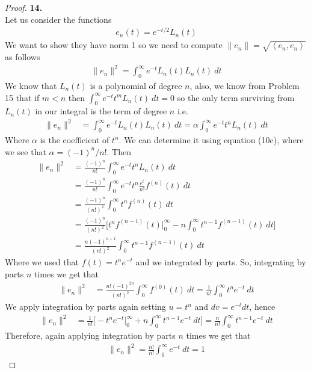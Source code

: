 \documentclass[11pt]{article}
\newcommand{\inprd}[1]{\left\langle{#1}\right\rangle}
\theoremstyle{definition}
\begin{document}
\cleardoublepage
\begin{proof}{\textbf{14.}}\\
Let us consider the functions 
\begin{align*}
    e_n(t) = e^{-t/2}L_n(t)
\end{align*}
We want to show they have norm 1 so we need to compute
$\|e_n\| = \sqrt{\inprd{e_n, e_n}}$ as follows
\begin{align*}
    \|e_n\|^2 = \int_0^\infty e^{-t}L_n(t) L_n(t)~dt
\end{align*}
We know that $L_n(t)$ is a polynomial of degree $n$, also, we know from
Problem 15 that if $m < n$ then $\int_0^\infty e^{-t}t^m L_n(t)~dt = 0$
so the only term surviving from $L_n(t)$ in our integral is the term of degree
$n$ i.e.
\begin{align*}
    \|e_n\|^2 &= \int_0^\infty e^{-t}L_n(t) L_n(t)~dt
    = \alpha\int_0^\infty e^{-t}t^n L_n(t)~dt
\end{align*}
Where $\alpha$ is the coefficient of $t^n$. We can determine it using equation
(10c), where we see that $\alpha = (-1)^n/n!$.
Then
\begin{align*}
    \|e_n\|^2 &= \frac{(-1)^n}{n!}\int_0^\infty e^{-t}t^n L_n(t)~dt\\
    &= \frac{(-1)^n}{n!}\int_0^\infty e^{-t}t^n \frac{e^{t}}{n!}f^{(n)}(t)~dt\\
    &= \frac{(-1)^n}{(n!)^2}\int_0^\infty t^nf^{(n)}(t)~dt\\
    &= \frac{(-1)^n}{(n!)^2}\bigg[
    t^nf^{(n-1)}(t)\bigg|_{0}^\infty - n\int_0^\infty t^{n-1}f^{(n-1)}(t)~dt
    \bigg]\\
    &= \frac{n(-1)^{n+1}}{(n!)^2}\int_0^\infty t^{n-1}f^{(n-1)}(t)~dt
\end{align*}
Where we used that $f(t) = t^n e^{-t}$ and we integrated by parts.
So, integrating by parts $n$ times we get that
\begin{align*}
    \|e_n\|^2
    &= \frac{n!(-1)^{2n}}{(n!)^2}\int_0^\infty f^{(0)}(t)~dt
    = \frac{1}{n!}\int_0^\infty t^n e^{-t}~dt
\end{align*}
We apply integration by parts again setting $u = t^n$ and $dv = e^{-t} dt$,
hence
\begin{align*}
    \|e_n\|^2
    &= \frac{1}{n!}\bigg[ -t^ne^{-t}\bigg|_0^\infty
    + n\int_0^\infty t^{n-1} e^{-t}~dt\bigg]
    = \frac{n}{n!} \int_0^\infty t^{n-1} e^{-t}~dt
\end{align*}
Therefore, again applying integration by parts $n$ times we get that
\begin{align*}
    \|e_n\|^2
    = \frac{n!}{n!} \int_0^\infty e^{-t}~dt = 1
\end{align*}
\end{proof}
\end{document}
